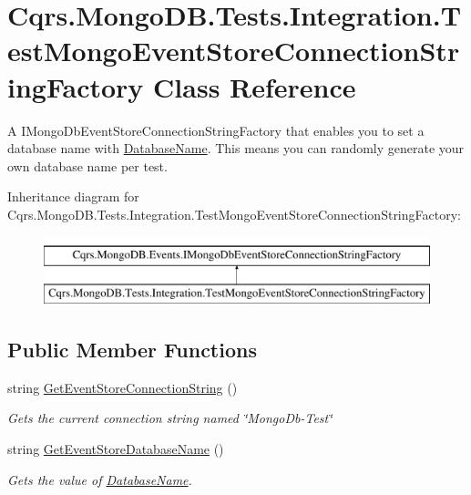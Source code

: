 \hypertarget{classCqrs_1_1MongoDB_1_1Tests_1_1Integration_1_1TestMongoEventStoreConnectionStringFactory}{}\section{Cqrs.\+Mongo\+D\+B.\+Tests.\+Integration.\+Test\+Mongo\+Event\+Store\+Connection\+String\+Factory Class Reference}
\label{classCqrs_1_1MongoDB_1_1Tests_1_1Integration_1_1TestMongoEventStoreConnectionStringFactory}


A I\+Mongo\+Db\+Event\+Store\+Connection\+String\+Factory that enables you to set a database name with \hyperlink{classCqrs_1_1MongoDB_1_1Tests_1_1Integration_1_1TestMongoEventStoreConnectionStringFactory_a647bfdbf4eef2cffe60f86e3ac01efac_a647bfdbf4eef2cffe60f86e3ac01efac}{Database\+Name}. This means you can randomly generate your own database name per test.  


Inheritance diagram for Cqrs.\+Mongo\+D\+B.\+Tests.\+Integration.\+Test\+Mongo\+Event\+Store\+Connection\+String\+Factory\+:\begin{figure}[H]
\begin{center}
\leavevmode
\includegraphics[height=2.000000cm]{classCqrs_1_1MongoDB_1_1Tests_1_1Integration_1_1TestMongoEventStoreConnectionStringFactory}
\end{center}
\end{figure}
\subsection*{Public Member Functions}
\begin{DoxyCompactItemize}
\item 
string \hyperlink{classCqrs_1_1MongoDB_1_1Tests_1_1Integration_1_1TestMongoEventStoreConnectionStringFactory_a73b68d1160bae4e92bed4445303d6a8f_a73b68d1160bae4e92bed4445303d6a8f}{Get\+Event\+Store\+Connection\+String} ()
\begin{DoxyCompactList}\small\item\em Gets the current connection string named \char`\"{}\+Mongo\+Db-\/\+Test\char`\"{} \end{DoxyCompactList}\item 
string \hyperlink{classCqrs_1_1MongoDB_1_1Tests_1_1Integration_1_1TestMongoEventStoreConnectionStringFactory_adbefedfb3bea3521f72333ce47575301_adbefedfb3bea3521f72333ce47575301}{Get\+Event\+Store\+Database\+Name} ()
\begin{DoxyCompactList}\small\item\em Gets the value of \hyperlink{classCqrs_1_1MongoDB_1_1Tests_1_1Integration_1_1TestMongoEventStoreConnectionStringFactory_a647bfdbf4eef2cffe60f86e3ac01efac_a647bfdbf4eef2cffe60f86e3ac01efac}{Database\+Name}. \end{DoxyCompactList}\end{DoxyCompactItemize}
